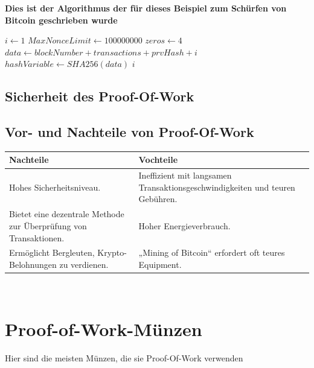 \documentclass[ngerman]{scrreprt}
\begin{document}
\begin{LARGE}
	\textbf{Dies ist der Algorithmus \textcommabelow der für dieses Beispiel zum Schürfen von Bitcoin geschrieben wurde} \\
\end{LARGE}
\begin{algorithmic}
	\State $i \gets 1$
	\State $MaxNonceLimit \gets 100000000$
	\State $zeros \gets 4$
		\State $data \gets blockNumber + transactions + prvHash + i$
		\State $hashVariable \gets  SHA256(data)$
			\Return $i$
		\EndIf
	\EndFor
	
\end{algorithmic}

\section{Sicherheit des Proof-Of-Work}

\section{Vor- und Nachteile von Proof-Of-Work}

	\begin{tabular}{ |l|l| } 
		\hline
		Nachteile & Vochteile \\
		\hline
		Hohes Sicherheitsniveau.  & Ineffizient mit langsamen Transaktionsgeschwindigkeiten und teuren Gebühren.  \\
		\hline
		Bietet eine dezentrale Methode zur Überprüfung von Transaktionen. &  Hoher Energieverbrauch. \\
		\hline
		 Ermöglicht Bergleuten, Krypto-Belohnungen zu verdienen. &  „Mining of Bitcoin“ erfordert oft teures Equipment. \\
		 \hline
	\end{tabular} \\


\chapter{Proof-of-Work-Münzen}
Hier sind die meisten Münzen, die sie Proof-Of-Work verwenden
\end{document}
